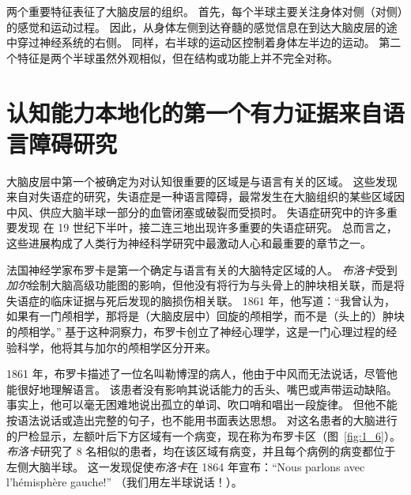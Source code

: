 两个重要特征表征了大脑皮层的组织。
首先，每个半球主要关注身体对侧（对侧）的感觉和运动过程。
因此，从身体左侧到达脊髓的感觉信息在到达大脑皮层的途中穿过神经系统的右侧。
同样，右半球的运动区控制着身体左半边的运动。
第二个特征是两个半球虽然外观相似，但在结构或功能上并不完全对称。



\section{认知能力本地化的第一个有力证据来自语言障碍研究}

大脑皮层中第一个被确定为对认知很重要的区域是与语言有关的区域。
这些发现来自对失语症的研究，失语症是一种语言障碍，最常发生在大脑组织的某些区域因中风、供应大脑半球一部分的血管闭塞或破裂而受损时。
失语症研究中的许多重要发现
在 19 世纪下半叶，接二连三地出现许多重要的失语症研究。
总而言之，这些进展构成了人类行为神经科学研究中最激动人心和最重要的章节之一。


法国神经学家布罗卡是第一个确定与语言有关的大脑特定区域的人。
\textit{布洛卡}受到\textit{加尔}绘制大脑高级功能图的影响，但他没有将行为与头骨上的肿块相关联，而是将失语症的临床证据与死后发现的脑损伤相关联。
1861 年，他写道：“我曾认为，如果有一门颅相学，那将是（大脑皮层中）回旋的颅相学，而不是（头上的）肿块的颅相学。” 
基于这种洞察力，布罗卡创立了神经心理学，这是一门心理过程的经验科学，他将其与加尔的颅相学区分开来。


1861 年，布罗卡描述了一位名叫勒博涅的病人，他由于中风而无法说话，尽管他能很好地理解语言。
该患者没有影响其说话能力的舌头、嘴巴或声带运动缺陷。
事实上，他可以毫无困难地说出孤立的单词、吹口哨和唱出一段旋律。
但他不能按语法说话或造出完整的句子，也不能用书面表达思想。
对这名患者的大脑进行的尸检显示，左额叶后下方区域有一个病变，现在称为布罗卡区（图~\ref{fig:1_6}）。
\textit{布洛卡}研究了 8 名相似的患者，均在该区域有病变，并且每个病例的病变都位于左侧大脑半球。
这一发现促使\textit{布洛卡}在 1864 年宣布：“Nous parlons avec l’hémisphère gauche!” （我们用左半球说话！）。


